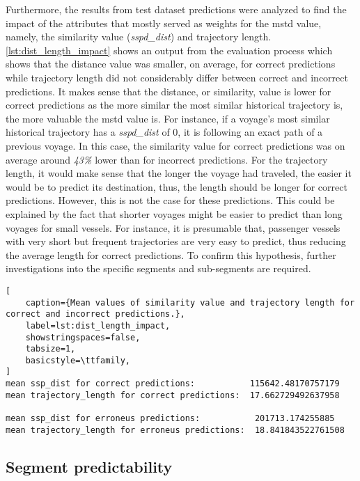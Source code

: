 Furthermore, the results from test dataset predictions were analyzed to find the impact of the attributes that mostly served as weights for the \acrshort{mstd} value, namely, the similarity value (\textit{sspd\_dist}) and trajectory length. \cref{lst:dist_length_impact} shows an output from the evaluation process which shows that the distance value was smaller, on average, for correct predictions while trajectory length did not considerably differ between correct and incorrect predictions. It makes sense that the distance, or similarity, value is lower for correct predictions as the more similar the most similar historical trajectory is, the more valuable the \acrshort{mstd} value is. For instance, if a voyage's most similar historical trajectory has a \textit{sspd\_dist} of 0, it is following an exact path of a previous voyage. In this case, the similarity value for correct predictions was on average around \textit{43\%} lower than for incorrect predictions. For the trajectory length, it would make sense that the longer the voyage had traveled, the easier it would be to predict its destination, thus, the length should be longer for correct predictions. However, this is not the case for these predictions. This could be explained by the fact that shorter voyages might be easier to predict than long voyages for small vessels. For instance, it is presumable that, passenger vessels with very short but frequent trajectories are very easy to predict, thus reducing the average length for correct predictions. To confirm this hypothesis, further investigations into the specific segments and sub-segments are required.

\begin{lstlisting}[
    caption={Mean values of similarity value and trajectory length for correct and incorrect predictions.},
    label=lst:dist_length_impact,
    showstringspaces=false,
    tabsize=1,
    basicstyle=\ttfamily,
]
mean ssp_dist for correct predictions:           115642.48170757179
mean trajectory_length for correct predictions:  17.662729492637958

mean ssp_dist for erroneus predictions:           201713.174255885
mean trajectory_length for erroneus predictions:  18.841843522761508
\end{lstlisting}

\subsection{Segment predictability}

